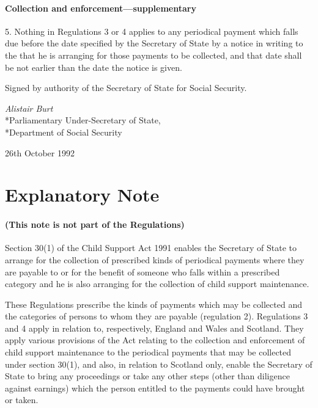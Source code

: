 \documentclass[12pt,a4paper]{article}
\begin{document}

\subsection[5. Collection and enforcement—supplementary]{Collection and enforcement—supplementary}

5.  Nothing in Regulations 3 or 4 applies to any periodical payment which falls due before the date specified by the Secretary of State by a notice in writing to the 
that he is arranging for those payments to be collected, and that date shall be not earlier than the date the notice is given.



\bigskip

Signed by authority of the Secretary of State for Social Security.

{\raggedleft
\emph{Alistair Burt}\\*Parliamentary Under-Secretary of State,\\*Department of Social Security

}

26th October 1992

\part{Explanatory Note}

\renewcommand\parthead{--- Explanatory Note}

\subsection*{(This note is not part of the Regulations)}

 Section 30(1) of the Child Support Act 1991 enables the Secretary of State to arrange for the collection of prescribed kinds of periodical payments where they are payable to or for the benefit of someone who falls within a prescribed category and he is also arranging for the collection of child support maintenance.

  These Regulations prescribe the kinds of payments which may be collected and the categories of persons to whom they are payable (regulation 2). Regulations 3 and 4 apply in relation to, respectively, England and Wales and Scotland. They apply various provisions of the Act relating to the collection and enforcement of child support maintenance to the periodical payments that may be collected under section 30(1), and also, in relation to Scotland only, enable the Secretary of State to bring any proceedings or take any other steps (other than diligence against earnings) which the person entitled to the payments could have brought or taken.
\end{document}

